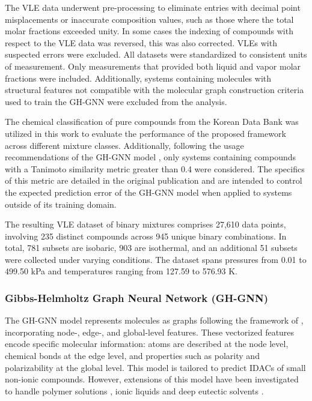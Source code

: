 The VLE data underwent pre-processing to eliminate entries with decimal point misplacements or inaccurate composition values, such as those where the total molar fractions exceeded unity. In some cases the indexing of compounds with respect to the VLE data was reversed, this was also corrected. VLEs with suspected errors were excluded. All datasets were standardized to consistent units of measurement. Only measurements that provided both liquid and vapor molar fractions were included. Additionally, systems containing molecules with structural features not compatible with the molecular graph construction criteria used to train the GH-GNN \cite{medina2023gibbs} were excluded from the analysis.

The chemical classification of pure compounds from the Korean Data Bank was utilized in this work to evaluate the performance of the proposed framework across different mixture classes. Additionally, following the usage recommendations of the GH-GNN model \cite{medina2023gibbs}, only systems containing compounds with a Tanimoto similarity metric greater than 0.4 were considered. The specifics of this metric are detailed in the original publication \cite{medina2023gibbs} and are intended to control the expected prediction error of the GH-GNN model when applied to systems outside of its training domain.

The resulting VLE dataset of binary mixtures comprises 27,610 data points, involving 235 distinct compounds across 945 unique binary combinations. In total, 781 subsets are isobaric, 903 are isothermal, and an additional 51 subsets were collected under varying conditions. The dataset spans pressures from 0.01 to 499.50 kPa and temperatures ranging from 127.59 to 576.93 K.
 
\subsubsection{Gibbs-Helmholtz Graph Neural Network (GH-GNN)}

The GH-GNN model \cite{medina2023gibbs} represents molecules as graphs following the framework of \citet{battaglia2018relational}, incorporating node-, edge-, and global-level features. These vectorized features encode specific molecular information: atoms are described at the node level, chemical bonds at the edge level, and properties such as polarity and polarizability at the global level. This model is tailored to predict IDACs of small non-ionic compounds. However, extensions of this model have been investigated to handle polymer solutions \cite{sanchez2023gibbs}, ionic liquids \cite{medina2024systematic} and deep eutectic solvents \cite{morales2024graph}.

